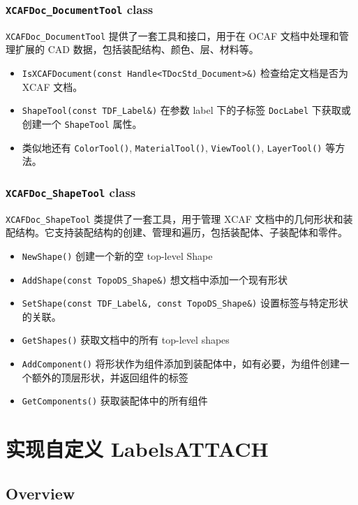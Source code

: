 \documentclass[11pt]{article}
\let\oldsection\section
\renewcommand{\section}{\clearpage\oldsection}
\begin{document}
\subsubsection{\texttt{XCAFDoc\_DocumentTool} class}
\label{sec:org9b5d819}

\texttt{XCAFDoc\_DocumentTool} 提供了一套工具和接口，用于在 OCAF 文档中处理和管理扩展的 CAD 数据，包括装配结构、颜色、层、材料等。

\begin{itemize}
\item \texttt{IsXCAFDocument(const Handle<TDocStd\_Document>\&)} 检查给定文档是否为 XCAF 文档。
\item \texttt{ShapeTool(const TDF\_Label\&)} 在参数 label 下的子标签 \texttt{DocLabel} 下获取或创建一个 \texttt{ShapeTool} 属性。
\item 类似地还有 \texttt{ColorTool()}, \texttt{MaterialTool()}, \texttt{ViewTool()}, \texttt{LayerTool()} 等方法。
\end{itemize}
\subsubsection{\texttt{XCAFDoc\_ShapeTool} class}
\label{sec:org7886da5}

\texttt{XCAFDoc\_ShapeTool} 类提供了一套工具，用于管理 XCAF 文档中的几何形状和装配结构。它支持装配结构的创建、管理和遍历，包括装配体、子装配体和零件。

\begin{itemize}
\item \texttt{NewShape()} 创建一个新的空 top-level Shape
\item \texttt{AddShape(const TopoDS\_Shape\&)} 想文档中添加一个现有形状
\item \texttt{SetShape(const TDF\_Label\&, const TopoDS\_Shape\&)} 设置标签与特定形状的关联。
\item \texttt{GetShapes()} 获取文档中的所有 top-level shapes
\item \texttt{AddComponent()} 将形状作为组件添加到装配体中，如有必要，为组件创建一个额外的顶层形状，并返回组件的标签
\item \texttt{GetComponents()} 获取装配体中的所有组件
\end{itemize}
\section{实现自定义 Labels\hfill{}\textsc{ATTACH}}
\label{sec:orga55a03b}
\subsection{Overview}
\label{sec:orgfd66e33}
\end{document}
